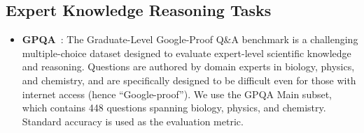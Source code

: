 \subsection{Expert Knowledge Reasoning Tasks}
\begin{itemize}
    \item \textbf{GPQA}~\cite{rein2023gpqa}: The Graduate-Level Google-Proof Q\&A benchmark is a challenging multiple-choice dataset designed to evaluate expert-level scientific knowledge and reasoning. Questions are authored by domain experts in biology, physics, and chemistry, and are specifically designed to be difficult even for those with internet access (hence ``Google-proof''). We use the GPQA Main subset, which contains 448 questions spanning biology, physics, and chemistry. Standard accuracy is used as the evaluation metric.
\end{itemize}

